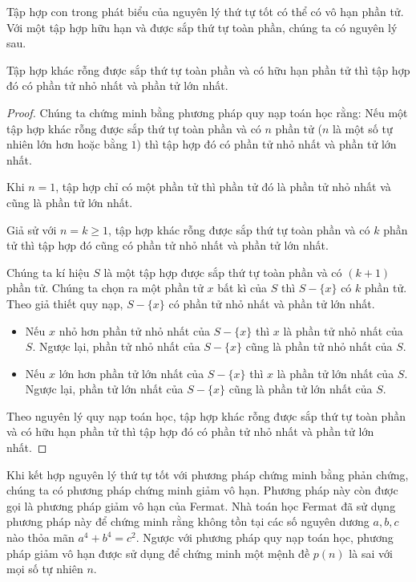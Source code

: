 Tập hợp con trong phát biểu của nguyên lý thứ tự tốt có thể có vô hạn phần tử. Với một tập hợp hữu hạn và được sắp thứ tự toàn phần, chúng ta có nguyên lý sau.
\begin{theorem}
    Tập hợp khác rỗng được sắp thứ tự toàn phần và có hữu hạn phần tử thì tập hợp đó có phần tử nhỏ nhất và phần tử lớn nhất.
\end{theorem}

\begin{proof}
    Chúng ta chứng minh bằng phương pháp quy nạp toán học rằng: Nếu một tập hợp khác rỗng được sắp thứ tự toàn phần và có $n$ phần tử ($n$ là một số tự nhiên lớn hơn hoặc bằng $1$) thì tập hợp đó có phần tử nhỏ nhất và phần tử lớn nhất.

    Khi $n = 1$, tập hợp chỉ có một phần tử thì phần tử đó là phần tử nhỏ nhất và cũng là phần tử lớn nhất.

    Giả sử với $n = k\geq 1$, tập hợp khác rỗng được sắp thứ tự toàn phần và có $k$ phần tử thì tập hợp đó cũng có phần tử nhỏ nhất và phần tử lớn nhất.

    Chúng ta kí hiệu $S$ là một tập hợp được sắp thứ tự toàn phần và có $(k+1)$ phần tử. Chúng ta chọn ra một phần tử $x$ bất kì của $S$ thì $S - \{x\}$ có $k$ phần tử. Theo giả thiết quy nạp, $S - \{x\}$ có phần tử nhỏ nhất và phần tử lớn nhất.
    \begin{itemize}
        \item Nếu $x$ nhỏ hơn phần tử nhỏ nhất của $S - \{x\}$ thì $x$ là phần tử nhỏ nhất của $S$. Ngược lại, phần tử nhỏ nhất của $S - \{x\}$ cũng là phần tử nhỏ nhất của $S$.
        \item Nếu $x$ lớn hơn phần tử lớn nhất của $S - \{x\}$ thì $x$ là phần tử lớn nhất của $S$. Ngược lại, phần tử lớn nhất của $S - \{x\}$ cũng là phần tử lớn nhất của $S$.
    \end{itemize}

    Theo nguyên lý quy nạp toán học, tập hợp khác rỗng được sắp thứ tự toàn phần và có hữu hạn phần tử thì tập hợp đó có phần tử nhỏ nhất và phần tử lớn nhất.
\end{proof}

Khi kết hợp nguyên lý thứ tự tốt với phương pháp chứng minh bằng phản chứng, chúng ta có phương pháp chứng minh giảm vô hạn. Phương pháp này còn được gọi là phương pháp giảm vô hạn của Fermat. Nhà toán học Fermat đã sử dụng phương pháp này để chứng minh rằng không tồn tại các số nguyên dương $a, b, c$ nào thỏa mãn $a^{4} + b^{4} = c^{2}$. Ngược với phương pháp quy nạp toán học, phương pháp giảm vô hạn được sử dụng để chứng minh một mệnh đề $p(n)$ là sai với mọi số tự nhiên $n$.

